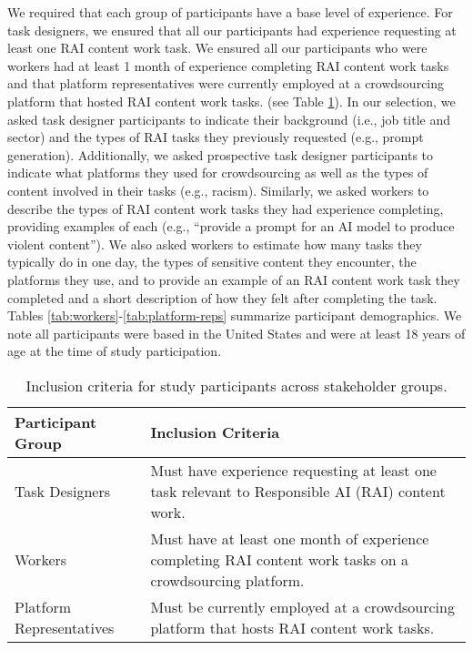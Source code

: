 We required that each group of participants have a base level of experience. For task designers, we ensured that all our participants had experience requesting at least one RAI content work task. We ensured all our participants who were workers had at least 1 month of experience completing RAI content work tasks and that platform representatives were currently employed at a crowdsourcing platform that hosted RAI content work tasks. (see Table \ref{tab:inclusion-criteria}). In our selection, we asked task designer participants to indicate their background (i.e., job title and sector) and the types of RAI tasks they previously requested (e.g., prompt generation). Additionally, we asked prospective task designer participants to indicate what platforms they used for crowdsourcing as well as the types of content involved in their tasks (e.g., racism). Similarly, we asked workers to describe the types of RAI content work tasks they had experience completing, providing examples of each (e.g., ``provide a prompt for an AI model to produce violent content''). We also asked workers to estimate how many tasks they typically do in one day, the types of sensitive content they encounter, the platforms they use, and to provide an example of an RAI content work task they completed and a short description of how they felt after completing the task. Tables \ref{tab:workers}-\ref{tab:platform-reps} summarize participant demographics. We note all participants were based in the United States and were at least 18 years of age at the time of study participation. 


\begin{table}[ht]
\centering
\begin{tabular}{|p{4cm}|p{10cm}|}
\hline
\textbf{Participant Group} & \textbf{Inclusion Criteria} \\
\hline
Task Designers & Must have experience requesting at least one task relevant to Responsible AI (RAI) content work. \\
\hline
Workers & Must have at least one month of experience completing RAI content work tasks on a crowdsourcing platform. \\
\hline
Platform Representatives & Must be currently employed at a crowdsourcing platform that hosts RAI content work tasks. \\
\hline
\end{tabular}
\caption{Inclusion criteria for study participants across stakeholder groups.}
\label{tab:inclusion-criteria}
\end{table}




